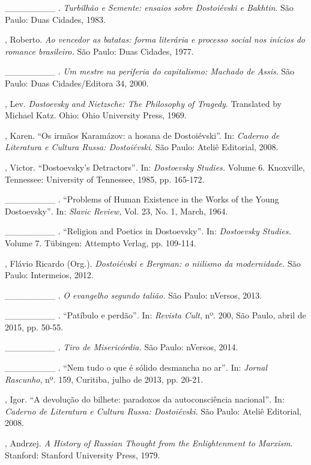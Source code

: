 \begin{Parskip}
\_\_\_\_\_\_\_\_ . \emph{Turbilhão e Semente: ensaios sobre Dostoiévski
e Bakhtin}. São Paulo: Duas Cidades, 1983.

, Roberto. \emph{Ao vencedor as batatas: forma literária e
processo social nos inícios do romance brasileiro.} São Paulo: Duas
Cidades, 1977.

\_\_\_\_\_\_\_\_ . \emph{Um mestre na periferia do capitalismo: Machado
de Assis}. São Paulo: Duas Cidades/Editora 34, 2000.

, Lev. \emph{Dostoevsky and Nietzsche: The Philosophy of
Tragedy}. Translated by Michael Katz. Ohio: Ohio University Press, 1969.

, Karen. ``Os irmãos Karamázov: a hosana de Dostoiévski''. In:
\emph{Caderno de Literatura e Cultura Russa: Dostoiévski}. São Paulo:
Ateliê Editorial, 2008.

, Victor. ``Dostoevsky's Detractors''\emph{.} In: \emph{Dostoevsky
Studies.} Volume 6. Knoxville, Tennessee: University of Tennessee, 1985,
pp. 165-172.

\_\_\_\_\_\_\_\_ . ``Problems of Human Existence in the Works of the
Young Dostoevsky''\emph{.} In: \emph{Slavic Review,} Vol. 23, No. 1,
March, 1964.

\_\_\_\_\_\_\_\_ . ``Religion and Poetics in Dostoevsky''\emph{.} In:
\emph{Dostoevsky Studies.} Volume 7. Tübingen: Attempto Verlag, pp.
109-114.

, Flávio Ricardo (Org.). \emph{Dostoiévski e Bergman: o niilismo
da modernidade.} São Paulo: Intermeios, 2012.

\_\_\_\_\_\_\_\_ . \emph{O evangelho segundo talião.} São Paulo:
nVersos, 2013.

\_\_\_\_\_\_\_\_ . ``Patíbulo e perdão''\emph{.} In: \emph{Revista
Cult}, nº. 200, São Paulo, abril de 2015, pp. 50-55.

\_\_\_\_\_\_\_\_ . \emph{Tiro de Misericórdia.} São Paulo: nVersos,
2014.

\_\_\_\_\_\_\_\_ . ``Nem tudo o que é sólido desmancha no ar''\emph{.}
In: \emph{Jornal Rascunho}, nº. 159, Curitiba, julho de 2013, pp. 20-21.

, Igor. ``A devolução do bilhete: paradoxos da autoconsciência
nacional''\emph{.} In: \emph{Caderno de Literatura e Cultura Russa:
Dostoiévski}. São Paulo: Ateliê Editorial, 2008.

, Andrzej. \emph{A History of Russian Thought from the
Enlightenment to Marxism}. Stanford: Stanford University Press, 1979.


\end{Parskip}

